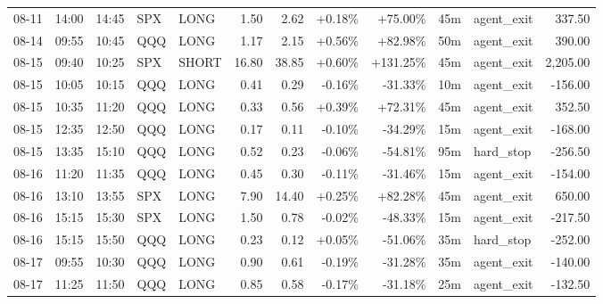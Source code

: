 \documentclass[11pt,a4paper,twoside]{article}
\begin{document}
\begin{center}
\begin{longtable}{>{\color{txtmain}}l l l l l r r r r r >{\color{txtmain}}l r}
08-11 & 14:00 & 14:45 & SPX & LONG & 1.50 & 2.62 & \textcolor{wingreen}{+0.18\%} & \textcolor{wingreen}{+75.00\%} & 45m & agent\_exit & \textcolor{wingreen}{337.50} \\
08-14 & 09:55 & 10:45 & QQQ & LONG & 1.17 & 2.15 & \textcolor{wingreen}{+0.56\%} & \textcolor{wingreen}{+82.98\%} & 50m & agent\_exit & \textcolor{wingreen}{390.00} \\
08-15 & 09:40 & 10:25 & SPX & SHORT & 16.80 & 38.85 & \textcolor{wingreen}{+0.60\%} & \textcolor{wingreen}{+131.25\%} & 45m & agent\_exit & \textcolor{wingreen}{2,205.00} \\
08-15 & 10:05 & 10:15 & QQQ & LONG & 0.41 & 0.29 & \textcolor{lossred}{-0.16\%} & \textcolor{lossred}{-31.33\%} & 10m & agent\_exit & \textcolor{lossred}{-156.00} \\
08-15 & 10:35 & 11:20 & QQQ & LONG & 0.33 & 0.56 & \textcolor{wingreen}{+0.39\%} & \textcolor{wingreen}{+72.31\%} & 45m & agent\_exit & \textcolor{wingreen}{352.50} \\
08-15 & 12:35 & 12:50 & QQQ & LONG & 0.17 & 0.11 & \textcolor{lossred}{-0.10\%} & \textcolor{lossred}{-34.29\%} & 15m & agent\_exit & \textcolor{lossred}{-168.00} \\
08-15 & 13:35 & 15:10 & QQQ & LONG & 0.52 & 0.23 & \textcolor{lossred}{-0.06\%} & \textcolor{lossred}{-54.81\%} & 95m & hard\_stop & \textcolor{lossred}{-256.50} \\
08-16 & 11:20 & 11:35 & QQQ & LONG & 0.45 & 0.30 & \textcolor{lossred}{-0.11\%} & \textcolor{lossred}{-31.46\%} & 15m & agent\_exit & \textcolor{lossred}{-154.00} \\
08-16 & 13:10 & 13:55 & SPX & LONG & 7.90 & 14.40 & \textcolor{wingreen}{+0.25\%} & \textcolor{wingreen}{+82.28\%} & 45m & agent\_exit & \textcolor{wingreen}{650.00} \\
08-16 & 15:15 & 15:30 & SPX & LONG & 1.50 & 0.78 & \textcolor{lossred}{-0.02\%} & \textcolor{lossred}{-48.33\%} & 15m & agent\_exit & \textcolor{lossred}{-217.50} \\
08-16 & 15:15 & 15:50 & QQQ & LONG & 0.23 & 0.12 & \textcolor{wingreen}{+0.05\%} & \textcolor{lossred}{-51.06\%} & 35m & hard\_stop & \textcolor{lossred}{-252.00} \\
08-17 & 09:55 & 10:30 & QQQ & LONG & 0.90 & 0.61 & \textcolor{lossred}{-0.19\%} & \textcolor{lossred}{-31.28\%} & 35m & agent\_exit & \textcolor{lossred}{-140.00} \\
08-17 & 11:25 & 11:50 & QQQ & LONG & 0.85 & 0.58 & \textcolor{lossred}{-0.17\%} & \textcolor{lossred}{-31.18\%} & 25m & agent\_exit & \textcolor{lossred}{-132.50} \\

\end{longtable}
\end{center}
\end{document}
